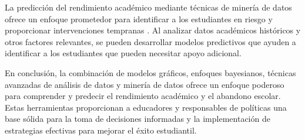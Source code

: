 La predicción del rendimiento académico mediante técnicas de minería de datos ofrece un enfoque prometedor para identificar a los estudiantes en riesgo
y proporcionar intervenciones tempranas \cite{garcia2018prediccion, wang2017literature}. Al analizar datos académicos históricos y otros factores relevantes,
se pueden desarrollar modelos predictivos que ayuden a identificar a los estudiantes que pueden necesitar apoyo adicional.

En conclusión, la combinación de modelos gráficos, enfoques bayesianos, técnicas avanzadas de análisis de datos y minería de datos ofrece un enfoque poderoso
para comprender y predecir el rendimiento académico y el abandono escolar. Estas herramientas proporcionan a educadores y responsables de políticas una base
sólida para la toma de decisiones informadas y la implementación de estrategias efectivas para mejorar el éxito estudiantil.
\vfill
